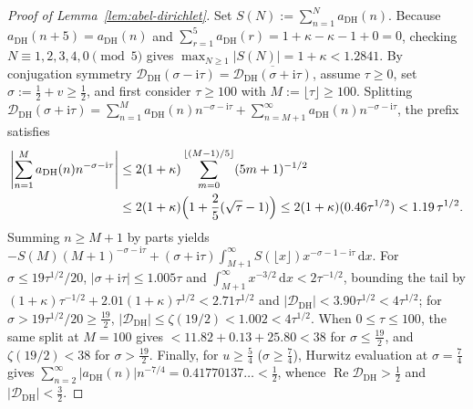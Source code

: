 \documentclass[11pt,a4paper,reqno]{amsart}
\theoremstyle{definition}
\theoremstyle{remark}
\numberwithin{equation}{section}
\newcommand{\dd}{\mathrm{d}}
\newcommand{\ii}{\mathrm{i}}
\DeclareMathOperator{\Reop}{Re}
\begin{document}
\begin{proof}[Proof of Lemma~\ref{lem:abel-dirichlet}]
Set $S(N) := \sum_{n=1}^{N} a_{\mathrm{DH}}(n)$. Because $a_{\mathrm{DH}}(n+5) = a_{\mathrm{DH}}(n)$ and $\sum_{r=1}^{5} a_{\mathrm{DH}}(r) = 1 + \kappa - \kappa - 1 + 0 = 0$, checking $N \equiv 1,2,3,4,0 \pmod{5}$ gives $\max_{N \ge 1}|S(N)| = 1 + \kappa < 1.2841$. By conjugation symmetry $\mathcal{D}_{\mathrm{DH}}(\sigma - \ii\tau) = \overline{\mathcal{D}_{\mathrm{DH}}(\sigma + \ii\tau)}$, assume $\tau \ge 0$, set $\sigma := \frac{1}{2} + v \ge \frac{1}{2}$, and first consider $\tau \ge 100$ with $M := \lfloor\tau\rfloor \ge 100$. Splitting $\mathcal{D}_{\mathrm{DH}}(\sigma + \ii\tau) = \sum_{n=1}^{M} a_{\mathrm{DH}}(n)n^{-\sigma-\ii\tau} + \sum_{n=M+1}^{\infty} a_{\mathrm{DH}}(n)n^{-\sigma-\ii\tau}$, the prefix satisfies
\begin{equation}
  \begin{aligned}
    \left|\sum_{n=1}^{M} a_{\mathrm{DH}}(n)n^{-\sigma-\ii\tau}\right|
    &\le 2(1+\kappa)\sum_{m=0}^{\lfloor (M-1)/5\rfloor} (5m+1)^{-1/2} \\
    &\le 2(1+\kappa)\Bigl(1 + \frac{2}{5}(\sqrt{\tau} - 1)\Bigr)
    \le 2(1+\kappa)(0.46\tau^{1/2}) < 1.19\,\tau^{1/2}.
  \end{aligned}
  \label{eq:abel-prefix}
\end{equation}
Summing $n \ge M + 1$ by parts yields $-S(M)(M+1)^{-\sigma-\ii\tau} + (\sigma + \ii\tau)\int_{M+1}^{\infty} S(\lfloor x\rfloor)x^{-\sigma-1-\ii\tau}\,\dd x$. For $\sigma \le 19\tau^{1/2}/20$, $|\sigma + \ii\tau| \le 1.005\tau$ and $\int_{M+1}^{\infty} x^{-3/2}\,\dd x < 2\tau^{-1/2}$, bounding the tail by $(1+\kappa)\tau^{-1/2} + 2.01(1+\kappa)\tau^{1/2} < 2.71\tau^{1/2}$ and $|\mathcal{D}_{\mathrm{DH}}| < 3.90\tau^{1/2} < 4\tau^{1/2}$; for $\sigma > 19\tau^{1/2}/20 \ge \frac{19}{2}$, $|\mathcal{D}_{\mathrm{DH}}| \le \zeta(19/2) < 1.002 < 4\tau^{1/2}$. When $0 \le \tau \le 100$, the same split at $M = 100$ gives $< 11.82 + 0.13 + 25.80 < 38$ for $\sigma \le \frac{19}{2}$, and $\zeta(19/2) < 38$ for $\sigma > \frac{19}{2}$. Finally, for $u \ge \frac{5}{4}$ ($\sigma \ge \frac{7}{4}$), Hurwitz evaluation at $\sigma = \frac{7}{4}$ gives $\sum_{n=2}^{\infty}|a_{\mathrm{DH}}(n)|n^{-7/4} = 0.41770137\ldots < \frac{1}{2}$, whence $\Reop\mathcal{D}_{\mathrm{DH}} > \frac{1}{2}$ and $|\mathcal{D}_{\mathrm{DH}}| < \frac{3}{2}$.
\end{proof}
\end{document}
